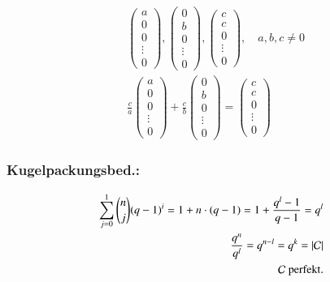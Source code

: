 \begin{align*}
	&\begin{pmatrix}
	a \\ 0 \\ 0 \\ \vdots \\ 0
	\end{pmatrix},
	\begin{pmatrix}
	0 \\ b \\ 0 \\ \vdots \\ 0
	\end{pmatrix},
	\begin{pmatrix}
	c \\ c \\ 0 \\ \vdots \\ 0
	\end{pmatrix}, \quad a,b,c \neq 0
	\\
	&\frac{c}{a}
	\begin{pmatrix}
	a \\ 0 \\ 0 \\ \vdots \\ 0
	\end{pmatrix} +
	\frac{c}{b}
	\begin{pmatrix}
	0 \\ b \\ 0 \\ \vdots \\ 0
	\end{pmatrix} =
	\begin{pmatrix}
	c \\ c \\ 0 \\ \vdots \\ 0
	\end{pmatrix}
\end{align*}
\subsubsection{Kugelpackungsbed.:}

\begin{align*}
	\sum_{j=0}^1{\binom{n}{j} (q-1)^i}=1 + n \cdot (q-1) = 1 + \frac{q^l-1}{q-1}=q^l\\
	\frac{q^n}{q^l}=q^{n-l}=q^k = \left| \mathcal{C} \right|\\
	\mathcal{C} \text{ perfekt.}
\end{align*}
%
%

